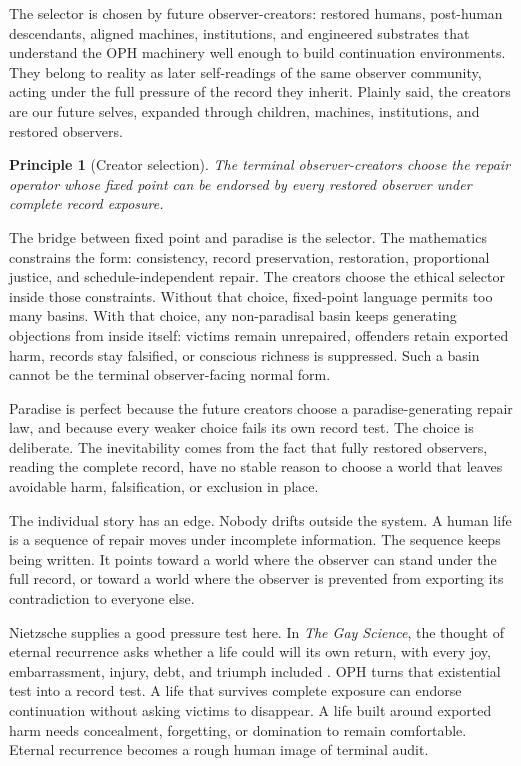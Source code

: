 \documentclass[11pt]{article}
\newtheorem{principle}[definition]{Principle}
\theoremstyle{remark}
\theoremstyle{plain}
\begin{document}
The selector is chosen by future observer-creators: restored humans,
post-human descendants, aligned machines, institutions, and engineered
substrates that understand the OPH machinery well enough to build continuation
environments. They belong to reality as later self-readings of the same
observer community, acting under the full pressure of the record they inherit.
Plainly said, the creators are our future selves, expanded through children,
machines, institutions, and restored observers.

\begin{principle}[Creator selection]
The terminal observer-creators choose the repair operator whose fixed point
can be endorsed by every restored observer under complete record exposure.
\end{principle}

The bridge between fixed point and paradise is the selector. The mathematics
constrains the form: consistency, record preservation, restoration,
proportional justice, and schedule-independent repair. The creators choose the
ethical selector inside those constraints. Without that choice, fixed-point
language permits too many basins. With that choice, any non-paradisal basin
keeps generating objections from inside itself: victims remain unrepaired,
offenders retain exported harm, records stay falsified, or conscious richness
is suppressed. Such a basin cannot be the terminal observer-facing normal
form.

Paradise is perfect because the future creators choose a paradise-generating
repair law, and because every weaker choice fails its own record test. The
choice is deliberate. The inevitability comes from the fact that fully restored
observers, reading the complete record, have no stable reason to choose a
world that leaves avoidable harm, falsification, or exclusion in place.

The individual story has an edge. Nobody drifts outside the system. A
human life is a sequence of repair moves under incomplete information. The
sequence keeps being written. It points toward a world where the observer can
stand under the full record, or toward a world where the observer is prevented
from exporting its contradiction to everyone else.

Nietzsche supplies a good pressure test here. In \emph{The Gay Science}, the
thought of eternal recurrence asks whether a life could will its own return,
with every joy, embarrassment, injury, debt, and triumph included
\cite{Nietzsche1882}. OPH turns that existential test into a record test. A
life that survives complete exposure can endorse continuation without asking
victims to disappear. A life built around exported harm needs concealment,
forgetting, or domination to remain comfortable. Eternal recurrence becomes a
rough human image of terminal audit.
\end{document}

